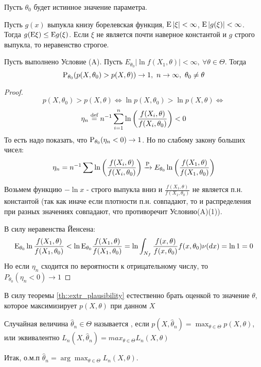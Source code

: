 Пусть \(\theta_0\) будет истинное значение параметра.
\begin{lemma}
    Пусть \(g(x)\) выпукла книзу борелевская функция, \(\E\left\lvert \xi \right\rvert  <\infty\),
    \(\E\left\lvert g(\xi) \right\rvert  <\infty\). Тогда \(g(\E\xi) \leq \E g(\xi)\). Если \(\xi\)
    не является почти наверное константой и \(g\) строго выпукла, то неравенство строгое.
\end{lemma}
\begin{theorem} \label{th::extr_plausibility}
    Пусть выполнено Условие (A). Пусть \(E_{\theta_0} \left\lvert \ln f(X_1, \theta) \right\rvert  < \infty,\ \forall \theta \in \Theta\).
    Тогда
    \[\P_{\theta_0}(p(X, \theta_0) > p(X, \theta)) \rightarrow 1,\ n\rightarrow \infty,\ \theta_0 \neq \theta\]
\end{theorem}
\begin{proof}
    \[p(X, \theta_0) > p(X, \theta) \Leftrightarrow \ln p(X, \theta_0) > \ln p(X, \theta) \Leftrightarrow\]
    \[\eta_n\defeq n^{-1} \sum_{i=1}^n \ln \left(\frac{f(X_i, \theta)}{f(X_i, \theta_0)}\right) < 0\]
    То есть надо показать, что \(\P_{\theta_0}(\eta_n < 0) \rightarrow 1\). Но по слабому закону больших чисел:
    \[\eta_n = n^{-1}\sum \ln \left(\frac{f(X_i, \theta)}{f(X_i, \theta_0)} \right) \xrightarrow{\P}
    E_{\theta_0}\ln \left(\frac{f(X_1, \theta)}{f(X_1, \theta_0)} \right) \]

    Возьмем функцию \(-\ln x\) - строго выпукла вниз и \(\frac{f(X_1, \theta)}{f(X_1, \theta_0)}\)
    не является п.н. константой (так как иначе если плотности п.н. совпадают,
    то и распределения при разных значениях совпадают, что противоречит Условию(A)(1)).

    В силу неравенства Йенсена:
    \[\E_{\theta_0} \ln \frac{f(X_1, \theta)}{f(X_1, \theta_0)} < \ln \E_{\theta_0} \frac{f(X_1, \theta)}{f(X_1, \theta_0)} = \ln \int_{N_f} \frac{f(x, \theta)}{f(x, \theta_0)} f(x, \theta_0) \nu(dx) = \ln1 = 0\]
    Но если \(\eta_n\) сходится по вероятности к отрицательному числу, то \(P_{\theta_0}(\eta_n < 0) \rightarrow 1\)
\end{proof}
В силу теоремы \ref{th::extr_plausibility} естественно брать
оценкой то значение \(\theta\), которое максимизирует \(p(X, \theta)\) при данном \(X\)

\begin{definition}
    Случайная величина \(\widehat{\theta}_n \in \Theta\) называется
    , если
    \(p(X, \widehat{\theta}_n) = \max_{\theta\in\Theta} p(X, \theta)\),
    или эквивалентно \(L_n(X, \widehat{\theta}_n) = max_{\theta\in\Theta} L_n(X, \theta)\)
\end{definition}
Итак, о.м.п \(\widehat{\theta}_n = \arg\max_{\theta\in\Theta} L_n(X, \theta)\).

